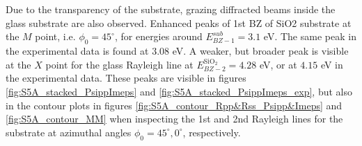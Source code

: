 Due to the transparency of the substrate, grazing diffracted beams inside the glass substrate are also observed. Enhanced peaks of 1st BZ of SiO2 substrate at the $M$ point, i.e. $\phi_0=45^\circ$, for energies around $E_{BZ-1}^{sub}=3.1$ eV. The same peak in the experimental data is found at $3.08$ eV\cite{Brakstad:15}. A weaker, but broader peak is visible at the $X$ point for the glass Rayleigh line at $E_{BZ-2}^{\text{SiO}_2}=4.28$ eV, or at $4.15$ eV in the experimental data. These peaks are visible in figures \ref{fig:S5A_stacked_PsippImeps} and \ref{fig:S5A_stacked_PsippImeps_exp}, but also in the contour plots in figures \ref{fig:S5A_contour_Rpp&Rss_Psipp&Imeps} and \ref{fig:S5A_contour_MM} when inspecting the 1st and 2nd Rayleigh lines for the substrate at azimuthal angles $\phi_0=45^\circ, 0^\circ$, respectively.

